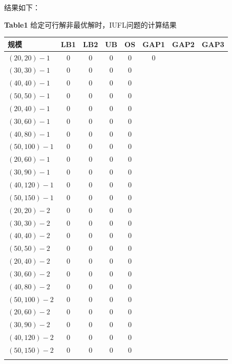 \documentclass[UTF8]{article}
\begin{document}
结果如下：
{\small\begin{table}[h!]

\centerline{\small{\heiti\bf Table1}  给定可行解非最优解时，IUFL问题的计算结果}
\vskip 2mm
\centering
\begin{tabular}{lccccccc}
    \shline
规模&LB1 &LB2&UB  &OS & GAP1 & GAP2 & GAP3\\
    \hline
$(20,20)-1$ & 0 & 0 & 0  & 0 & 0\\
$(30,30)-1$ & 0 & 0   & 0  & 0 \\
$(40,40)-1$ & 0 & 0 & 0  & 0 \\
$(50,50)-1$ & 0 & 0   & 0  & 0 \\
$(20,40)-1$ & 0 & 0   & 0  & 0 \\
$(30,60)-1$ & 0 & 0   & 0  & 0 \\
$(40,80)-1$ & 0 & 0   & 0  & 0 \\
$(50,100)-1$ & 0 & 0   & 0  & 0 \\
$(20,60)-1$ & 0 & 0   & 0  & 0 \\
$(30,90)-1$ & 0 & 0   & 0  & 0 \\
$(40,120)-1$ & 0 & 0   & 0  & 0 \\
$(50,150)-1$ & 0 & 0   & 0  & 0 \\
$(20,20)-2$ & 0 & 0 & 0  & 0 \\
$(30,30)-2$ & 0 & 0   & 0  & 0 \\
$(40,40)-2$ & 0 & 0 & 0  & 0 \\
$(50,50)-2$ & 0 & 0   & 0  & 0 \\
$(20,40)-2$ & 0 & 0   & 0  & 0 \\
$(30,60)-2$ & 0 & 0   & 0  & 0 \\
$(40,80)-2$ & 0 & 0   & 0  & 0 \\
$(50,100)-2$ & 0 & 0   & 0  & 0 \\
$(20,60)-2$ & 0 & 0   & 0  & 0 \\
$(30,90)-2$ & 0 & 0   & 0  & 0 \\
$(40,120)-2$ & 0 & 0   & 0  & 0 \\
$(50,150)-2$ & 0 & 0   & 0  & 0 \\
   \shline
 \end{tabular}
 \end{table}}
\end{document}
